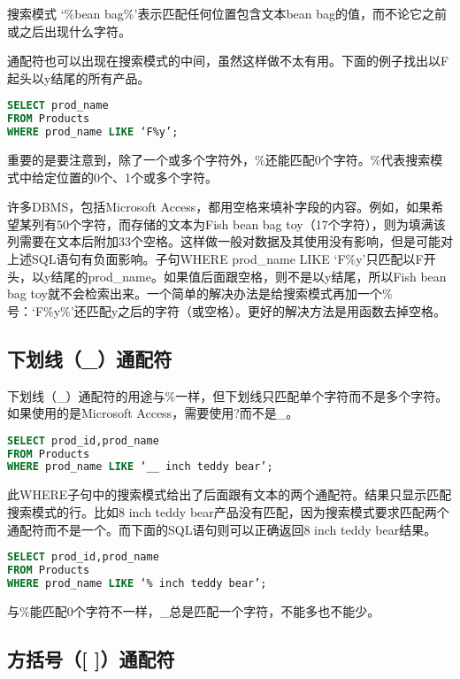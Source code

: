 搜索模式 ‘\%bean bag\%’表示匹配任何位置包含文本bean bag的值，而不论它之前或之后出现什么字符。

通配符也可以出现在搜索模式的中间，虽然这样做不太有用。下面的例子找出以F起头以y结尾的所有产品。

\begin{lstlisting}[language=SQL]
SELECT prod_name
FROM Products
WHERE prod_name LIKE ‘F%y’;
\end{lstlisting}

重要的是要注意到，除了一个或多个字符外，\%还能匹配0个字符。\%代表搜索模式中给定位置的0个、1个或多个字符。

许多DBMS，包括Microsoft Access，都用空格来填补字段的内容。例如，如果希望某列有50个字符，而存储的文本为Fish bean bag toy（17个字符），则为填满该列需要在文本后附加33个空格。这样做一般对数据及其使用没有影响，但是可能对上述SQL语句有负面影响。子句WHERE prod\_name LIKE ‘F\%y’只匹配以F开头，以y结尾的prod\_name。如果值后面跟空格，则不是以y结尾，所以Fish bean bag toy就不会检索出来。一个简单的解决办法是给搜索模式再加一个\%号：‘F\%y\%’还匹配y之后的字符（或空格）。更好的解决方法是用函数去掉空格。


\subsection{下划线（\_）通配符}

下划线（\_）通配符的用途与\%一样，但下划线只匹配单个字符而不是多个字符。如果使用的是Microsoft Access，需要使用?而不是\_。

\begin{lstlisting}[language=SQL]
SELECT prod_id,prod_name
FROM Products
WHERE prod_name LIKE ‘__ inch teddy bear’;
\end{lstlisting}

此WHERE子句中的搜索模式给出了后面跟有文本的两个通配符。结果只显示匹配搜索模式的行。比如8 inch teddy bear产品没有匹配，因为搜索模式要求匹配两个通配符而不是一个。而下面的SQL语句则可以正确返回8 inch teddy bear结果。

\begin{lstlisting}[language=SQL]
SELECT prod_id,prod_name
FROM Products
WHERE prod_name LIKE ‘% inch teddy bear’;
\end{lstlisting}

与\%能匹配0个字符不一样，\_总是匹配一个字符，不能多也不能少。

\subsection{方括号（[ ]）通配符}

